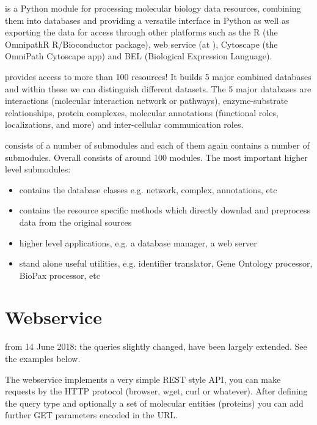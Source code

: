 \documentclass[letterpaper,10pt,english]{sphinxmanual}
\begin{document}
 is a Python module for processing molecular biology data resources,
combining them into databases and providing a versatile interface in Python
as well as exporting the data for access through other platforms such as
the R (the OmnipathR R/Bioconductor package), web service (at
), Cytoscape (the OmniPath Cytoscape app) and BEL
(Biological Expression Language).

 provides access to more than 100 resources! It builds 5 major
combined databases and within these we can distinguish different datasets.
The 5 major databases are interactions (molecular interaction network or
pathways), enzyme-substrate relationships, protein complexes, molecular
annotations (functional roles, localizations, and more) and inter-cellular
communication roles.

 consists of a number of submodules and each of them again contains
a number of submodules. Overall  consists of around 100 modules.
The most important higher level submodules:
\begin{itemize}
\item {} 
 contains the database classes e.g. network, complex,
annotations, etc

\item {} 
 contains the resource specific methods which directly
downlad and preprocess data from the original sources

\item {} 
 higher level applications, e.g. a database manager, a
web server

\item {} 
 stand alone useful utilities, e.g. identifier translator,
Gene Ontology processor, BioPax processor, etc

\end{itemize}


\chapter{Webservice}
\label{\detokenize{index:webservice}}
 from 14 June 2018: the queries slightly changed, have been
largely extended. See the examples below.

The webservice implements a very simple REST style API, you can make requests
by the HTTP protocol (browser, wget, curl or whatever). After defining the
query type and optionally a set of molecular entities (proteins) you can
add further GET parameters encoded in the URL.
\end{document}
